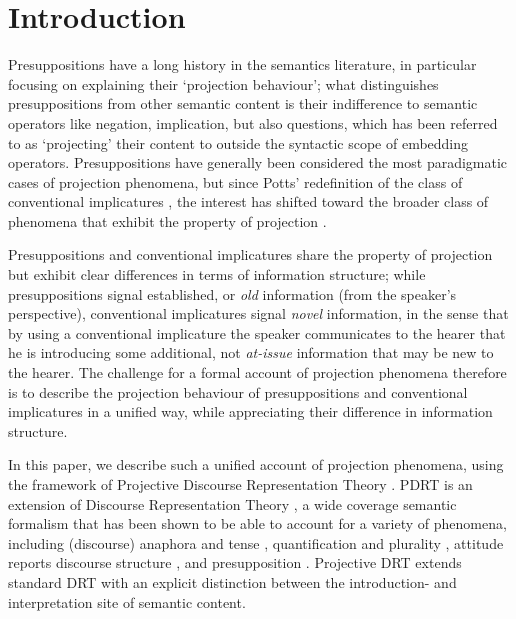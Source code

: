 \section{Introduction}\label{Introduction}

Presuppositions have a long history in the semantics literature, in
particular focusing on explaining their `projection behaviour'; what
distinguishes presuppositions from other semantic content is their
indifference to semantic operators like negation, implication, but also
questions, which has been referred to as `projecting' their content to
outside the syntactic scope of embedding operators.  Presuppositions have
generally been considered the most paradigmatic cases of projection
phenomena, but since Potts' redefinition of the class of conventional
implicatures \citep[CIs;][]{potts2003logic,potts2005logic}, the interest has
shifted toward the broader class of phenomena that exhibit the property of
projection \citep[see, e.g.,][]{simons2010projects}.



Presuppositions and conventional implicatures share the property of
projection but exhibit clear differences in terms of information structure;
while presuppositions signal established, or \textit{old} information (from
the speaker's perspective), conventional implicatures signal \textit{novel}
information, in the sense that by using a conventional implicature the
speaker communicates to the hearer that he is introducing some additional,
not \textit{at-issue} information that may be new to the hearer.  The
challenge for a formal account of projection phenomena therefore is to
describe the projection behaviour of presuppositions and conventional
implicatures in a unified way, while appreciating their difference in
information structure.

In this paper, we describe such a unified account of projection phenomena,
using the framework of Projective Discourse Representation Theory
\citep[PDRT;][]{venhuizen2013iwcs}. PDRT is an extension of Discourse
Representation Theory \citep[DRT;][]{kamp1981theory,kamp1993discourse},
a wide coverage semantic formalism that has been shown to be able to account
for a variety of phenomena, including (discourse) anaphora and tense
\citep{kamp1981theory}, quantification and plurality
\citep{kamp1993discourse}, attitude reports
\citep{asher1986belief,asher1989belief,zeevat1996neoclassical,maier2009presupposing}
discourse structure \citep{asher2003logics}, and presupposition
\citep{sandt1992presupposition,krahmer1998presupposition,geurts1999presuppositions}.
Projective DRT extends standard DRT with an explicit distinction between the
introduction- and interpretation site of semantic content.
